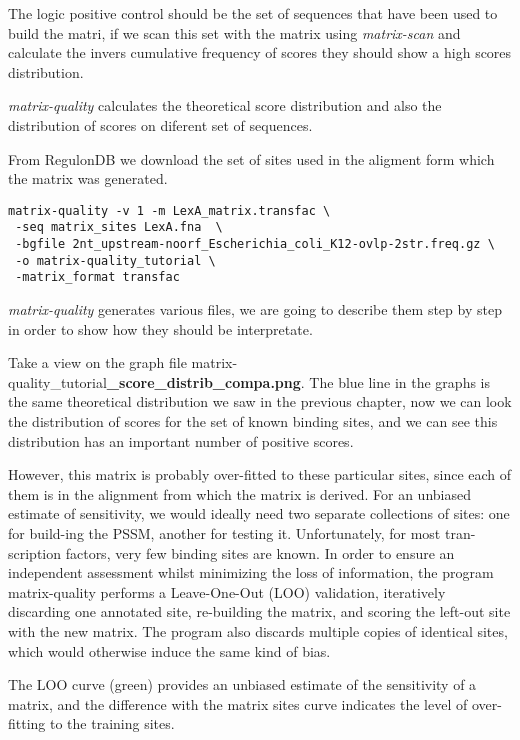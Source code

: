 The logic positive control should be the set of sequences that have
been used to build the matri, if we scan this set with the matrix
using \textit{matrix-scan} and calculate the invers cumulative
frequency of scores they should show a high scores distribution.

\textit{matrix-quality} calculates the theoretical score distribution
and also the distribution of scores on diferent set of sequences.

From RegulonDB we download the set of sites used in the aligment form
which the matrix was generated.

{\color{Blue} 
  \begin{footnotesize}
\begin{verbatim}
matrix-quality -v 1 -m LexA_matrix.transfac \
 -seq matrix_sites LexA.fna  \
 -bgfile 2nt_upstream-noorf_Escherichia_coli_K12-ovlp-2str.freq.gz \
 -o matrix-quality_tutorial \
 -matrix_format transfac  

\end{verbatim} 
  \end{footnotesize} 
}

\textit{matrix-quality} generates various files, we are going to
describe them step by step in order to show how they should be
interpretate.

Take a view on the graph file
matrix-quality\_tutorial\textbf{\_score\_distrib\_compa.png}.  The
blue line in the graphs is the same theoretical distribution we saw in
the previous chapter, now we can look the distribution of scores for
the set of known binding sites, and we can see this distribution has
an important number of positive scores.

However, this matrix is probably over-fitted to these particular
sites, since each of them is in the alignment from which the matrix is
derived. For an unbiased estimate of sensitivity, we would ideally
need two separate collections of sites: one for build-ing the PSSM,
another for testing it. Unfortunately, for most tran-scription
factors, very few binding sites are known. In order to ensure an
independent assessment whilst minimizing the loss of information, the
program matrix-quality performs a Leave-One-Out (LOO) validation,
iteratively discarding one annotated site, re-building the matrix, and
scoring the left-out site with the new matrix. The program also
discards multiple copies of identical sites, which would otherwise
induce the same kind of bias.

The LOO curve (green) provides an unbiased estimate of the sensitivity
of a matrix, and the difference with the matrix sites curve indicates
the level of over-fitting to the training sites.

